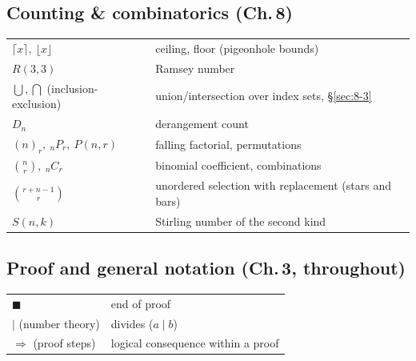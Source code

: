 \documentclass[11pt]{article}
\begin{document}
\subsection*{Counting \& combinatorics (Ch.\,8)}
\begin{longtable}{ll}
$\lceil x\rceil,\ \lfloor x\rfloor$ & ceiling, floor (pigeonhole bounds) \\
$R(3,3)$ & Ramsey number \\
$\bigcup,\bigcap$ (inclusion-exclusion) & union/intersection over index sets, \S\ref{sec:8-3} \\
$D_n$ & derangement count \\
$(n)_r,\ {}_nP_r,\ P(n,r)$ & falling factorial, permutations \\
$\binom{n}{r},\ {}_nC_r$ & binomial coefficient, combinations \\
$\binom{r+n-1}{r}$ & unordered selection with replacement (stars and bars) \\
$S(n,k)$ & Stirling number of the second kind \\
\end{longtable}

\subsection*{Proof and general notation (Ch.\,3, throughout)}
\begin{longtable}{ll}
$\blacksquare$ & end of proof \\
$\mid$ (number theory) & divides ($a\mid b$) \\
$\Rightarrow$ (proof steps) & logical consequence within a proof \\
\end{longtable}
\end{document}
